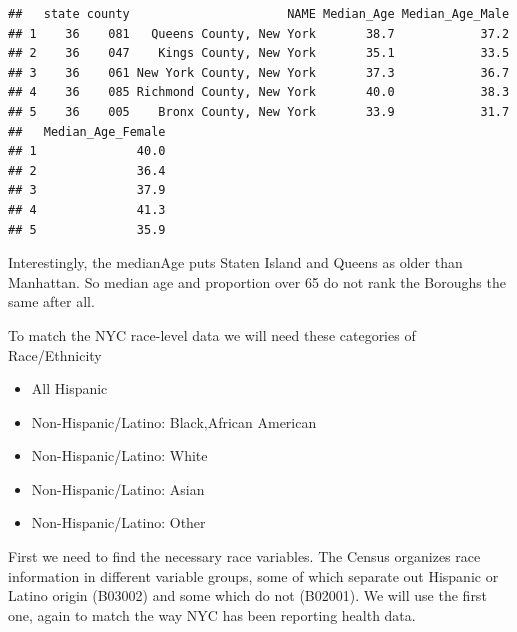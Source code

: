 \documentclass[openany]{book}
\newenvironment{Shaded}{\begin{snugshade}}{\end{snugshade}}
\newcommand{\DataTypeTok}[1]{\textcolor[rgb]{0.13,0.29,0.53}{#1}}
\newcommand{\DecValTok}[1]{\textcolor[rgb]{0.00,0.00,0.81}{#1}}
\newcommand{\KeywordTok}[1]{\textcolor[rgb]{0.13,0.29,0.53}{\textbf{#1}}}
\newcommand{\NormalTok}[1]{#1}
\newcommand{\OperatorTok}[1]{\textcolor[rgb]{0.81,0.36,0.00}{\textbf{#1}}}
\newcommand{\StringTok}[1]{\textcolor[rgb]{0.31,0.60,0.02}{#1}}
\providecommand{\tightlist}{%
  \setlength{\itemsep}{0pt}\setlength{\parskip}{0pt}}
\begin{document}
\begin{verbatim}
##   state county                      NAME Median_Age Median_Age_Male
## 1    36    081   Queens County, New York       38.7            37.2
## 2    36    047    Kings County, New York       35.1            33.5
## 3    36    061 New York County, New York       37.3            36.7
## 4    36    085 Richmond County, New York       40.0            38.3
## 5    36    005    Bronx County, New York       33.9            31.7
##   Median_Age_Female
## 1              40.0
## 2              36.4
## 3              37.9
## 4              41.3
## 5              35.9
\end{verbatim}

Interestingly, the medianAge puts Staten Island and Queens as older than Manhattan. So median age and proportion over 65 do not rank the Boroughs the same after all.

To match the NYC race-level data we will need these categories of Race/Ethnicity

\begin{itemize}
\tightlist
\item
  All Hispanic
\item
  Non-Hispanic/Latino: Black,African American
\item
  Non-Hispanic/Latino: White
\item
  Non-Hispanic/Latino: Asian
\item
  Non-Hispanic/Latino: Other
\end{itemize}

First we need to find the necessary race variables. The Census organizes race information in different variable groups, some of which separate out Hispanic or Latino origin (B03002) and some which do not (B02001). We will use the first one, again to match the way NYC has been reporting health data.

\begin{Shaded}
\end{Shaded}
\end{document}
